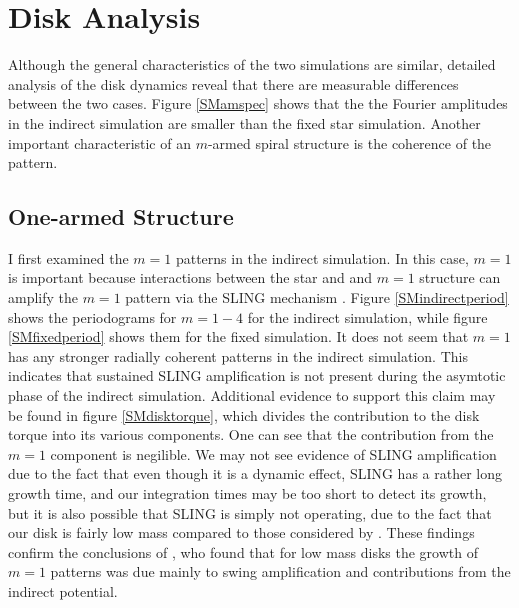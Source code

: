\section{Disk Analysis} \label{SMdisk}

Although the general characteristics of the two simulations are similar, detailed analysis of the disk dynamics reveal that there are measurable differences between the two cases. Figure \ref{SMamspec} shows that the the Fourier amplitudes in the indirect simulation are smaller than the fixed star simulation. Another important characteristic of an $m$-armed spiral structure is the coherence of the pattern. 

\subsection{One-armed Structure}\label{sec:ind:SMm1}

I first examined the $m = 1$ patterns in the indirect simulation. In this case, $m = 1$ is important because interactions between the star and and $m = 1$ structure can amplify the $m = 1$ pattern via the SLING mechanism \citep{adams1989,shu1990}. Figure \ref{SMindirectperiod} shows the periodograms for $m = 1-4$ for the indirect simulation, while figure \ref{SMfixedperiod} shows them for the fixed simulation. It does not seem that $m = 1$ has any stronger radially coherent patterns in the indirect simulation. This indicates that sustained SLING amplification is not present during the asymtotic phase of the indirect simulation. Additional evidence to support this claim may be found in figure \ref{SMdisktorque}, which divides the contribution to the disk torque into its various components. One can see that the contribution from the $m = 1$ component is negilible. We may not see evidence of SLING amplification due to the fact that even though it is a dynamic effect, SLING has a rather long growth time, and our integration times may be too short to detect its growth, but it is also possible that SLING is simply not operating, due to the fact that our disk is fairly low mass compared to those considered by \citet{adams1989}. These findings confirm the conclusions of \citet{noh1992}, who found that for low mass disks the growth of $m = 1$ patterns was due mainly to swing amplification and contributions from the indirect potential.

